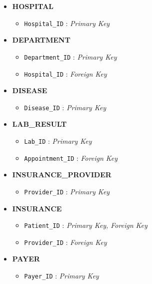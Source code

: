 \documentclass[12pt,a4paper]{article}
\begin{document}
\begin{itemize}[label=\textbf{--}]
	\item \textbf{HOSPITAL}
	      \begin{itemize}[label=$\bullet$]
		      \item \texttt{Hospital\_ID} : \textit{Primary Key}
	      \end{itemize}

	\item \textbf{DEPARTMENT}
	      \begin{itemize}[label=$\bullet$]
		      \item \texttt{Department\_ID} : \textit{Primary Key}
		      \item \texttt{Hospital\_ID} : \textit{Foreign Key}
	      \end{itemize}

	\item \textbf{DISEASE}
	      \begin{itemize}[label=$\bullet$]
		      \item \texttt{Disease\_ID} : \textit{Primary Key}
	      \end{itemize}

	\item \textbf{LAB\_RESULT}
	      \begin{itemize}[label=$\bullet$]
		      \item \texttt{Lab\_ID} : \textit{Primary Key}
		      \item \texttt{Appointment\_ID} : \textit{Foreign Key}
	      \end{itemize}

	\item \textbf{INSURANCE\_PROVIDER}
	      \begin{itemize}[label=$\bullet$]
		      \item \texttt{Provider\_ID} : \textit{Primary Key}
	      \end{itemize}

	\item \textbf{INSURANCE}
	      \begin{itemize}[label=$\bullet$]
		      \item \texttt{Patient\_ID} : \textit{Primary Key, Foreign Key}
		      \item \texttt{Provider\_ID} : \textit{Foreign Key}
	      \end{itemize}

	\item \textbf{PAYER}
	      \begin{itemize}[label=$\bullet$]
		      \item \texttt{Payer\_ID} : \textit{Primary Key}
	      \end{itemize}


\end{itemize}
\end{document}
